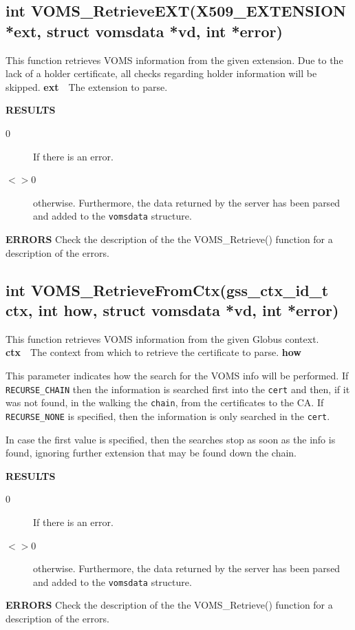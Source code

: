\documentclass[a4paper]{book}
\newcommand{\errors}{\noindent \textbf{ERRORS}\newline}
\newcommand{\result}{\noindent \textbf{RESULTS}\newline}
\newcommand{\parameter}[1]{\newline\textbf{#1}\ \ }
\begin{document}
\subsection{int VOMS\_RetrieveEXT(X509\_EXTENSION *ext, struct vomsdata
  *vd, int *error)}

This function retrieves VOMS information from the given extension.
Due to the lack of a holder certificate, all checks regarding holder
information will be skipped.
\parameter{ext}{The extension to parse.}

\result
\begin{description}
\item[0] If there is an error.
\item[$<>$0] otherwise.  Furthermore, the data returned by the server
  has been parsed and added to the \verb|vomsdata| structure.
\end{description}

\errors
Check the description of the the VOMS\_Retrieve() function for a
description of the errors.


\subsection{int VOMS\_RetrieveFromCtx(gss\_ctx\_id\_t ctx, int how, struct vomsdata
  *vd, int *error)}

This function retrieves VOMS information from the given Globus
context.
\parameter{ctx}{The context from which to retrieve the certificate
  to parse.}
\parameter{how}{This parameter indicates how the search for the VOMS
  info will be performed.  If \verb|RECURSE_CHAIN| then the
  information is searched first into the \verb|cert| and then, if it
  was not found, in the walking the \verb|chain|, from the
  certificates to the CA.  If \verb|RECURSE_NONE| is specified, then
  the information is only searched in the \verb|cert|.

  In case the first value is specified, then the searches stop as soon
  as the info is found, ignoring further extension that may be found
  down the chain.}

\result
\begin{description}
\item[0] If there is an error.
\item[$<>$0] otherwise.  Furthermore, the data returned by the server
  has been parsed and added to the \verb|vomsdata| structure.
\end{description}

\errors
Check the description of the the VOMS\_Retrieve() function for a
description of the errors.
\end{document}
